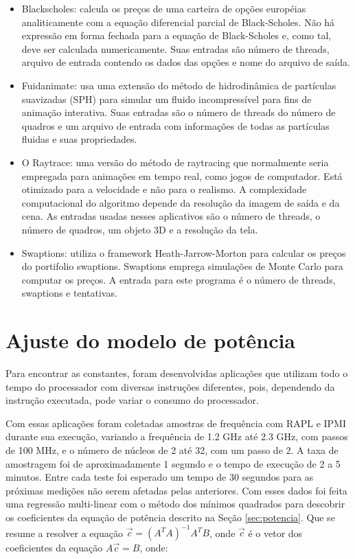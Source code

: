 \begin{itemize}
	
	\item Blackscholes: calcula os preços de uma carteira de opções européias analiticamente com a equação diferencial parcial de Black-Scholes. Não há expressão em forma fechada para a equação de Black-Scholes e, como tal, deve ser calculada numericamente. Suas entradas são número de threads, arquivo de entrada contendo os dados das opções e nome do arquivo de saída.
	
	\item Fuidanimate: usa uma extensão do método de hidrodinâmica de partículas suavizadas (SPH) para simular um fluido incompressível para fins de animação interativa. Suas entradas são o número de threads do número de quadros e um arquivo de entrada com informações de todas as partículas fluidas e suas propriedades.
	
	\item O Raytrace: uma versão do método de raytracing que normalmente seria empregada para animações em tempo real, como jogos de computador. Está otimizado para a velocidade e não para o realismo. A complexidade computacional do algoritmo depende da resolução da imagem de saída e da cena. As entradas usadas nesses aplicativos são o número de threads, o número de quadros, um objeto 3D e a resolução da tela.
	
	\item Swaptions: utiliza o framework Heath-Jarrow-Morton para calcular os preços do portifolio swaptions. Swaptions emprega simulações de Monte Carlo para computar os preços. A entrada para este programa é o número de threads, swaptions e tentativas. 
	
\end{itemize}

\section{Ajuste do modelo de potência} \label{sec:met_ajuste_pw}

Para encontrar as constantes, foram desenvolvidas aplicações que utilizam todo o tempo do processador com diversas instruções diferentes, pois, dependendo da instrução executada, pode variar o consumo do processador.

Com essas aplicações foram coletadas amostras de frequência com RAPL e IPMI durante sua execução, variando a frequência de 1.2 GHz até 2.3 GHz, com passos de 100 MHz, e o número de núcleos de 2 até 32, com um passo de 2. A taxa de amostragem foi de aproximadamente 1 segundo e o tempo de execução de 2 a 5 minutos. Entre cada teste foi esperado um tempo de 30 segundos para as próximas medições não serem afetadas pelas anteriores. Com esses dados foi feita uma regressão multi-linear com o método dos mínimos quadrados para descobrir os coeficientes da equação de potência descrito na Seção \ref{sec:potencia}. Que se resume a resolver a equação $\vec{c}=(A^TA)^{-1}A^TB$, onde $\vec{c}$ é o vetor dos coeficientes da equação $A\vec{c}=B$, onde:

